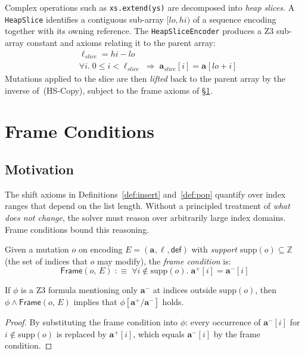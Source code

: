 \documentclass[11pt]{article}
\newcommand{\arrvar}[1]{\mathbf{a}_{#1}}
\newcommand{\lenvar}[1]{\ell_{#1}}
\newcommand{\defval}{\mathsf{def}}
\newcommand{\idx}{i}
\newcommand{\prestate}[1]{#1^{-}}
\newcommand{\poststate}[1]{#1^{+}}
\newcommand{\Frame}[2]{\mathsf{Frame}(#1,\,#2)}
\begin{document}
Complex operations such as \lstinline[style=jugeo-python]{xs.extend(ys)} are
decomposed into \emph{heap slices}.  A \texttt{HeapSlice} identifies a
contiguous sub-array $[lo, hi)$ of a sequence encoding together with its
owning reference.  The \texttt{HeapSliceEncoder} produces a Z3 sub-array
constant and axioms relating it to the parent array:
\begin{align}
  &\lenvar{\mathit{slice}} = hi - lo \tag{HS-Len}\\
  &\forall \idx.\; 0 \leq \idx < \lenvar{\mathit{slice}} \;\Rightarrow\;
    \arrvar{\mathit{slice}}[\idx] = \arrvar{}[lo + \idx] \tag{HS-Copy}
\end{align}
Mutations applied to the slice are then \emph{lifted} back to the parent
array by the inverse of~(HS-Copy), subject to the frame axioms of
\S\ref{sec:frame}.

\section{Frame Conditions}\label{sec:frame}

\subsection{Motivation}

The shift axioms in Definitions~\ref{def:insert} and~\ref{def:pop} quantify
over index ranges that depend on the list length.  Without a principled
treatment of \emph{what does not change}, the solver must reason over
arbitrarily large index domains.  Frame conditions bound this reasoning.

\begin{definition}\label{def:frame}
Given a mutation $o$ on encoding $E = (\arrvar{}, \lenvar{}, \defval)$ with
\emph{support} $\mathrm{supp}(o) \subseteq \mathbb{Z}$ (the set of indices
that $o$ may modify), the \emph{frame condition} is:
\[
  \Frame{o}{E} \;:\equiv\;
  \forall \idx \notin \mathrm{supp}(o).\;
  \poststate{\arrvar{}}[\idx] = \prestate{\arrvar{}}[\idx]
\]
\end{definition}

\begin{lemma}\label{lem:frame}
If $\phi$ is a Z3 formula mentioning only $\prestate{\arrvar{}}$ at indices
outside $\mathrm{supp}(o)$, then $\phi \wedge \Frame{o}{E}$ implies that
$\phi[\poststate{\arrvar{}}/\prestate{\arrvar{}}]$ holds.
\end{lemma}
\begin{proof}
By substituting the frame condition into $\phi$: every occurrence of
$\prestate{\arrvar{}}[\idx]$ for $\idx \notin \mathrm{supp}(o)$ is replaced by
$\poststate{\arrvar{}}[\idx]$, which equals $\prestate{\arrvar{}}[\idx]$ by
the frame condition.
\end{proof}
\end{document}
